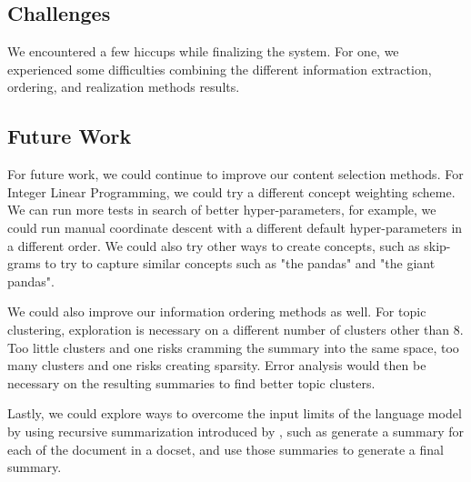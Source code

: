 \subsection{Challenges}

We encountered a few hiccups while finalizing the system. For one, we experienced some difficulties combining the different information extraction, ordering, and realization methods results.

\subsection{Future Work}
For future work, we could continue to improve our content selection methods. For Integer Linear Programming, we could try a different concept weighting scheme. We can run more tests in search of better hyper-parameters, for example, we could run manual coordinate descent with a different default hyper-parameters in a different order. We could also try other ways to create concepts, such as skip-grams to try to capture similar concepts such as "the pandas" and "the giant pandas".

We could also improve our information ordering methods as well. For topic clustering, exploration is necessary on a different number of clusters other than 8. Too little clusters and one risks cramming the summary into the same space, too many clusters and one risks creating sparsity. Error analysis would then be necessary on the resulting summaries to find better topic clusters. 

Lastly, we could explore ways to overcome the input limits of the language model by using recursive summarization introduced by \citet{openaibook}, such as generate a summary for each of the document in a docset, and use those summaries to generate a final summary. 









